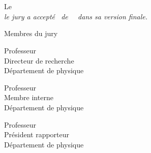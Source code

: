 \begin{comment}
\end{comment}
\makeatletter   %

\chapter*{}
\vspace{-4.7cm}

\thispagestyle{empty}

\begin{center}
    \vglue 2cm
    Le \underline{\hspace{5cm}}\\ 
    \vspace{2cm}
    \scalebox{1} %
    {\it le jury a accepté \leDocument\ de \monsieurMadame~\@author~dans sa version finale.} 
    
    \vspace{2cm}
    Membres du jury\\
    \vspace{2cm}

    Professeur \underline{\hspace{2.5cm}}\\
    Directeur de recherche\\
    Département de physique\\
    \vspace{2cm}
    
    Professeur \underline{\hspace{2.5cm}}\\
    Membre interne\\
    Département de physique\\
    \vspace{2cm}

    Professeur \underline{\hspace{2.5cm}}\\
    Président rapporteur\\
    Département de physique\\
    \vspace{2cm}
\end{center}


\makeatother    %
